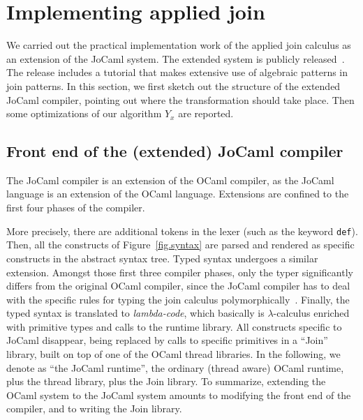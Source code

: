 \documentclass{LMCS}
\let \lst \lstinline
\newcommand{\jocaml}{\textrm{JoCaml}\xspace}
\newcommand{\ocaml}{\textrm{OCaml}\xspace}
\renewcommand{\_}{\mathord{\rule[-.25ex]{1ex}{.15ex}}}
\begin{document}
\section{Implementing applied join}
\label{sec.imp}

We carried out the practical implementation work of the applied join
calculus as an extension of the \jocaml system.
The extended system is publicly released~\cite{JoCaml}.
The release includes a tutorial that makes extensive use of
algebraic patterns in join patterns.
In this section, we
first sketch out the structure of the extended \jocaml compiler,
pointing out where the transformation should take place. Then some
optimizations of our algorithm $Y_x$ are reported.

\subsection{Front end of the (extended) \jocaml compiler}
\label{subsec.frontend}

The \jocaml compiler is an extension of the \ocaml compiler,
as the \jocaml language is an extension of the \ocaml language.
Extensions are confined to the first four phases of the compiler.

More precisely, there are additional tokens in the lexer (such as the
keyword \lst|def|).  Then, all the constructs of
Figure~\ref{fig.syntax} are parsed and rendered as specific constructs
in the abstract syntax tree. Typed syntax undergoes a
similar extension. Amongst those first three compiler phases, only the
typer significantly differs from the original \ocaml compiler, since
the \jocaml compiler has to deal with the specific rules for typing
the join calculus
polymorphically~\cite{Fournet-Laneve-Maranget-Remy:typing-join}.
Finally, the typed syntax is translated to \emph{lambda-code}, which
basically is $\lambda$-calculus enriched with primitive types and calls
to the runtime library.  All constructs specific to \jocaml disappear,
being replaced by calls to specific primitives in a ``\textsf{Join}''
library, built on top of one of the \ocaml thread libraries.  In the
following, we denote as ``the \jocaml runtime'', the ordinary (thread
aware) \ocaml runtime, plus the thread library, plus the \textsf{Join}
library. To summarize, extending the \ocaml system to the \jocaml
system amounts to modifying the front end of the compiler, and to
writing the \textsf{Join} library.
\end{document}
